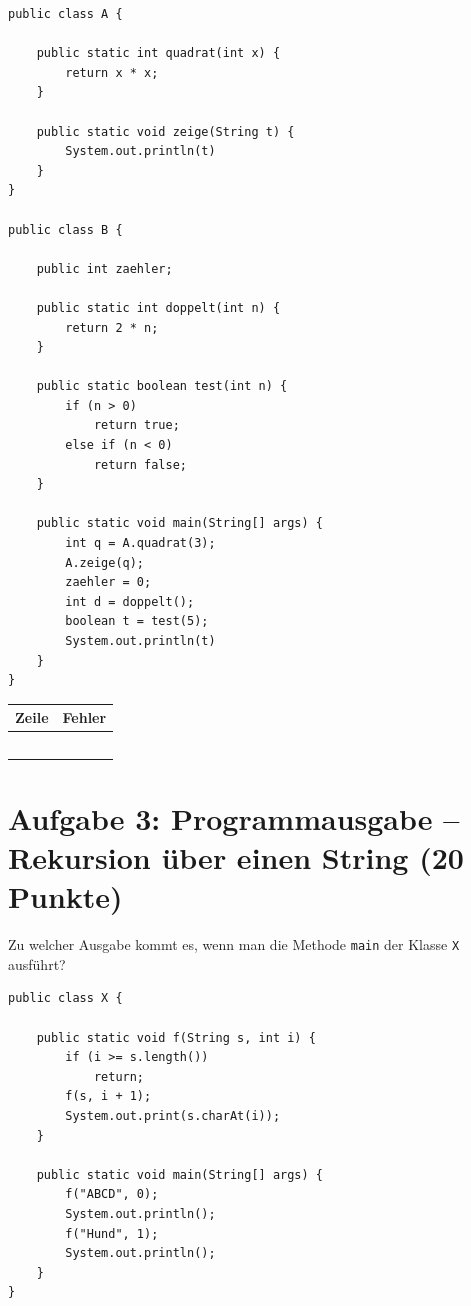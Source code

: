 \documentclass[
	fontsize=12pt,
	paper=a4,
	numbers=noenddot,
	parskip=half,
	openany
]{scrbook}
\begin{document}
\begin{lstlisting}
public class A {

    public static int quadrat(int x) {
        return x * x;
    }

    public static void zeige(String t) {
        System.out.println(t)
    }
}

public class B {

    public int zaehler;

    public static int doppelt(int n) {
        return 2 * n;
    }

    public static boolean test(int n) {
        if (n > 0)
            return true;
        else if (n < 0)
            return false;
    }

    public static void main(String[] args) {
        int q = A.quadrat(3);
        A.zeige(q);
        zaehler = 0;
        int d = doppelt();
        boolean t = test(5);
        System.out.println(t)
    }
}
\end{lstlisting}

\begin{center}
\begin{tabular}{|p{1.6cm}|p{10.5cm}|}
	\hline
	\textbf{Zeile} & \textbf{Fehler} \\ \hline
	& \\[2cm] \hline
	& \\[2cm] \hline
	& \\[2cm] \hline
	& \\[2cm] \hline
	& \\[2cm] \hline
\end{tabular}
\end{center}

\clearpage
\section*{Aufgabe 3: Programmausgabe -- Rekursion über einen String \hfill (20 Punkte)}

Zu welcher Ausgabe kommt es, wenn man die Methode \texttt{main} der Klasse \texttt{X} ausführt?

\begin{lstlisting}
public class X {

    public static void f(String s, int i) {
        if (i >= s.length())
            return;
        f(s, i + 1);
        System.out.print(s.charAt(i));
    }

    public static void main(String[] args) {
        f("ABCD", 0);
        System.out.println();
        f("Hund", 1);
        System.out.println();
    }
}
\end{lstlisting}
\end{document}
